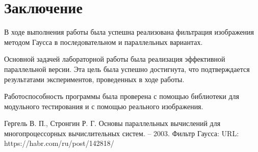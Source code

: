 \documentclass{report}
\begin{document}
\section*{Заключение}
В ходе выполнения работы была успешна реализована фильтрация изображения методом Гаусса в последовательном и параллельных вариантах. 
\par 
Основной задачей лабораторной работы была реализация эффективной параллельной версии. Эта цель была успешно достигнута, что подтверждается результатами экспериментов, проведенных в ходе работы. 
\par 
Работоспособность программы была проверена с помощью библиотеки для модульного тестирования и с помощью реального изображения.
\newpage

\begin{thebibliography}{1}
Гергель В. П., Стронгин Р. Г. Основы параллельных вычислений для многопроцессорных вычислительных систем. – 2003.
Фильтр Гаусса: URL: https://habr.com/ru/post/142818/
\end{thebibliography}
\newpage

\end{document}
